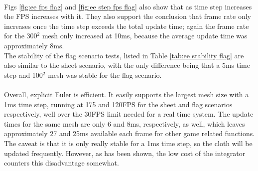\\Figs \ref{fig:ee fps flag} and \ref{fig:ee step fps flag} also show that as time step increases the FPS increases with it. They also support the conclusion that frame rate only increases once the time step exceeds the total update time; again the frame rate for the 300$^{2}$ mesh only increased at 10ms, because the average update time was approximately 8ms.
\\The stability of the flag scenario tests, listed in Table \ref{tab:ee stability flag} are also similar to the sheet scenario, with the only difference being that a 5ms time step and 100$^{2}$ mesh was stable for the flag scenario.
\\\\Overall, explicit Euler is efficient. It easily supports the largest mesh size with a 1ms time step, running at 175 and 120FPS for the sheet and flag scenarios respectively, well over the 30FPS limit needed for a real time system. The update times for the same mesh are only 6 and 8ms, respectively, as well, which leaves approximately 27 and 25ms available each frame for other game related functions. The caveat is that it is only really stable for a 1ms time step, so the cloth will be updated frequently. However, as has been shown, the low cost of the integrator counters this disadvantage somewhat.

